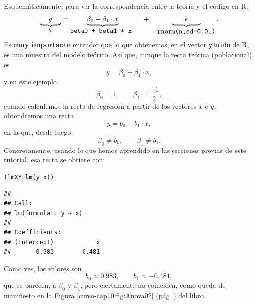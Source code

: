 \documentclass[10pt,a4paper]{article}\usepackage[]{graphicx}\usepackage[]{color}
\makeatletter
\newcommand{\hlopt}[1]{\textcolor[rgb]{0,0,0}{#1}}%
\newcommand{\hlstd}[1]{\textcolor[rgb]{0.345,0.345,0.345}{#1}}%
\newcommand{\hlkwb}[1]{\textcolor[rgb]{0.69,0.353,0.396}{#1}}%
\newcommand{\hlkwd}[1]{\textcolor[rgb]{0.737,0.353,0.396}{\textbf{#1}}}%
\newenvironment{kframe}{%
 \def\at@end@of@kframe{}%
 \ifinner\ifhmode%
  \def\at@end@of@kframe{\end{minipage}}%
  \begin{minipage}{\columnwidth}%
 \fi\fi%
 \def\FrameCommand##1{\hskip\@totalleftmargin \hskip-\fboxsep
 \colorbox{shadecolor}{##1}\hskip-\fboxsep
     \hskip-\linewidth \hskip-\@totalleftmargin \hskip\columnwidth}%
 \MakeFramed {\advance\hsize-\width
   \@totalleftmargin\z@ \linewidth\hsize
   \@setminipage}}%
 {\par\unskip\endMakeFramed%
 \at@end@of@kframe}
\newenvironment{knitrout}{}{} %
\makeatother
\begin{document}
Esquemáticamente, para ver la correspondencia entre la teoría y el código en R:
\[
        \underbrace{\phantom{\beta\beta}y\phantom{\beta\beta}}_{\mbox{\tt y}}=
        \underbrace{\beta_0 +\beta_1\cdot x}_{\mbox{\tt beta0 + beta1 * x }}
        \quad + \quad
        \underbrace{\phantom{\beta\beta\beta}\epsilon\phantom{\beta\beta\beta}}_{\mbox{\tt rnorm(n,sd=0.01)}}
        .
\]
Es {\bf muy importante} entender que lo que obtenemos, en el vector {\tt yRuido} de R, es una muestra del modelo teórico. Así que, aunque la recta teórica (poblacional) es
\[y=\beta_0+\beta_1\cdot x,\]
y en este ejemplo
\[\beta_0 = 1,\qquad \beta_1 = \dfrac{-1}{2},\]
cuando calculemos la recta de regresión a partir de los vectores $x$ e $y$, obtendremos una recta
\[y=b_0+b_1\cdot x,\]
en la que, desde luego,
\[\beta_0 \neq b_0,\qquad \beta_1\neq b_1 .\]
Concretamente, usando lo que hemos aprendido en las secciones previas de este tutorial, esa recta se obtiene con:
\begin{knitrout}
\color{fgcolor}\begin{kframe}
\begin{alltt}
\hlstd{(lmXY}\hlkwb{=} \hlkwd{lm}\hlstd{(y}\hlopt{~}\hlstd{x) )}
\end{alltt}
\begin{verbatim}
## 
## Call:
## lm(formula = y ~ x)
## 
## Coefficients:
## (Intercept)            x  
##       0.983       -0.481
\end{verbatim}
\end{kframe}
\end{knitrout}
Como ves, los valores son
\[
    b_0\approx 0.983,\qquad
    b_1\approx -0.481,
\]
que se parecen, a $\beta_0$ y $\beta_1$, pero ciertamente no coinciden, como queda de manifiesto en la Figura \ref{curso-cap10:fig:Anova02} (pág. \pageref{curso-cap10:fig:Anova02}) del libro.
\end{document}
